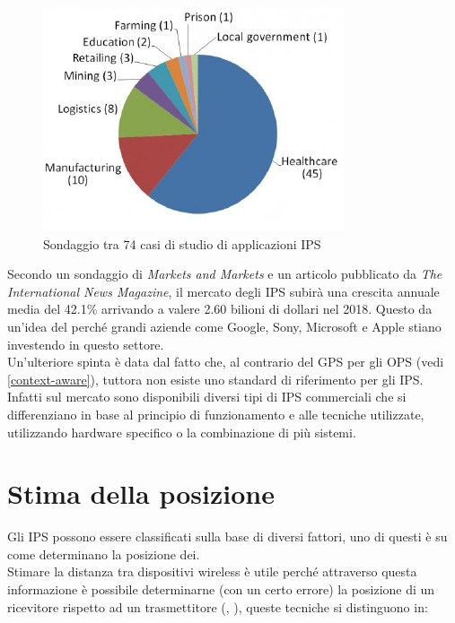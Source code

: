 \begin{figure}[H]  
	\centering 
	\includegraphics[scale=1.2]{ContestoApplicativo/application.png}
	\caption{Sondaggio tra 74 casi di studio di applicazioni IPS \cite{market}}
	\label{fig:surveyApplication}
\end{figure}

Secondo un sondaggio  di \textit{Markets and Markets} e un articolo pubblicato da\textit{ The International News Magazine}, il mercato degli IPS subirà una crescita annuale media del 42.1\% arrivando a valere 2.60 bilioni di dollari nel 2018. Questo da un'idea del perché grandi aziende come Google, Sony, Microsoft e Apple stiano investendo in questo settore.\\
Un'ulteriore spinta è data dal fatto che, al contrario del GPS per gli OPS (vedi \ref{context-aware}), tuttora non esiste uno standard di riferimento per gli IPS. Infatti sul mercato sono disponibili diversi tipi di IPS commerciali che si differenziano in base al principio di funzionamento e alle tecniche utilizzate, utilizzando hardware specifico o la combinazione di più sistemi.\\ 




\section{Stima della posizione}
\label{metodi_distanza}
Gli IPS possono essere classificati sulla base di diversi fattori, uno di questi è su come determinano la posizione dei.\\
Stimare \cite{IPS2} la distanza tra dispositivi wireless è utile perché attraverso questa informazione è possibile determinarne (con un certo errore) la posizione di un ricevitore rispetto ad un trasmettitore (\cite{alg1}, \cite{alg2}), queste tecniche si distinguono in:

